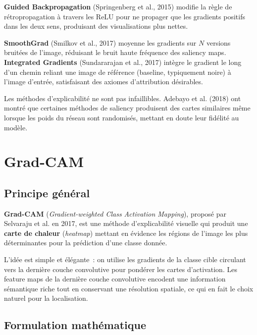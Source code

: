 \documentclass[a4paper,11pt,twoside]{book}
\begin{document}
\textbf{Guided Backpropagation} (Springenberg et al., 2015) modifie la règle de rétropropagation à travers les ReLU pour ne propager que les gradients positifs dans les deux sens, produisant des visualisations plus nettes.

\textbf{SmoothGrad} (Smilkov et al., 2017) moyenne les gradients sur $N$ versions bruitées de l'image, réduisant le bruit haute fréquence des saliency maps. \textbf{Integrated Gradients} (Sundararajan et al., 2017) intègre le gradient le long d'un chemin reliant une image de référence (baseline, typiquement noire) à l'image d'entrée, satisfaisant des axiomes d'attribution désirables.

\begin{notebox}[Attention]
Les méthodes d'explicabilité ne sont pas infaillibles. Adebayo et al. (2018) ont montré que certaines méthodes de saliency produisent des cartes similaires même lorsque les poids du réseau sont randomisés, mettant en doute leur fidélité au modèle.
\end{notebox}


\chapter{Grad-CAM}
\label{chap:gradcam}

\section{Principe général}

\textbf{Grad-CAM} (\textit{Gradient-weighted Class Activation Mapping}), proposé par Selvaraju et al. en 2017, est une méthode d'explicabilité visuelle qui produit une \textbf{carte de chaleur} (\textit{heatmap}) mettant en évidence les régions de l'image les plus déterminantes pour la prédiction d'une classe donnée.

L'idée est simple et élégante~: on utilise les gradients de la classe cible circulant vers la dernière couche convolutive pour pondérer les cartes d'activation. Les feature maps de la dernière couche convolutive encodent une information sémantique riche tout en conservant une résolution spatiale, ce qui en fait le choix naturel pour la localisation.

\section{Formulation mathématique}
\end{document}
